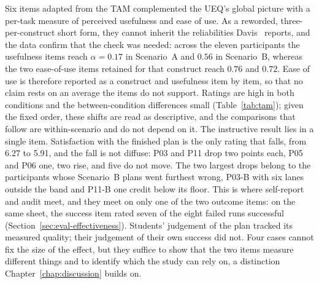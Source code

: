 Six items adapted from the TAM complemented the UEQ's global picture with a per-task measure of perceived usefulness and ease of use. As a reworded, three-per-construct short form, they cannot inherit the reliabilities Davis~\cite{davis_perceived_1989} reports, and the data confirm that the check was needed: across the eleven participants the usefulness items reach $\alpha=0.17$ in Scenario~A and $0.56$ in Scenario~B, whereas the two ease-of-use items retained for that construct reach $0.76$ and $0.72$. Ease of use is therefore reported as a construct and usefulness item by item, so that no claim rests on an average the items do not support. Ratings are high in both conditions and the between-condition differences small (Table~\ref{tab:tam}); given the fixed order, these shifts are read as descriptive, and the comparisons that follow are within-scenario and do not depend on it. The instructive result lies in a single item. Satisfaction with the finished plan is the only rating that falls, from 6.27 to 5.91, and the fall is not diffuse: P03 and P11 drop two points each, P05 and P06 one, two rise, and five do not move. The two largest drops belong to the participants whose Scenario~B plans went furthest wrong, P03-B with six lanes outside the band and P11-B one credit below its floor. This is where self-report and audit meet, and they meet on only one of the two outcome items: on the same sheet, the success item rated seven of the eight failed runs successful (Section~\ref{sec:eval-effectiveness}). Students' judgement of the plan tracked its measured quality; their judgement of their own success did not. Four cases cannot fix the size of the effect, but they suffice to show that the two items measure different things and to identify which the study can rely on, a distinction Chapter~\ref{chap:discussion} builds on.

